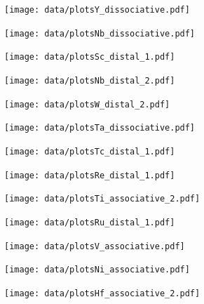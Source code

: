 \begin{figure}
\centering
\texttt{[image: data/plotsY\_dissociative.pdf]}
\end{figure}

\begin{figure}
\centering
\texttt{[image: data/plotsNb\_dissociative.pdf]}
\end{figure}

\begin{figure}
\centering
\texttt{[image: data/plotsSc\_distal\_1.pdf]}
\end{figure}

\begin{figure}
\centering
\texttt{[image: data/plotsNb\_distal\_2.pdf]}
\end{figure}

\begin{figure}
\centering
\texttt{[image: data/plotsW\_distal\_2.pdf]}
\end{figure}

\begin{figure}
\centering
\texttt{[image: data/plotsTa\_dissociative.pdf]}
\end{figure}

\begin{figure}
\centering
\texttt{[image: data/plotsTc\_distal\_1.pdf]}
\end{figure}

\begin{figure}
\centering
\texttt{[image: data/plotsRe\_distal\_1.pdf]}
\end{figure}

\begin{figure}
\centering
\texttt{[image: data/plotsTi\_associative\_2.pdf]}
\end{figure}

\begin{figure}
\centering
\texttt{[image: data/plotsRu\_distal\_1.pdf]}
\end{figure}

\begin{figure}
\centering
\texttt{[image: data/plotsV\_associative.pdf]}
\end{figure}

\begin{figure}
\centering
\texttt{[image: data/plotsNi\_associative.pdf]}
\end{figure}

\begin{figure}
\centering
\texttt{[image: data/plotsHf\_associative\_2.pdf]}
\end{figure}

